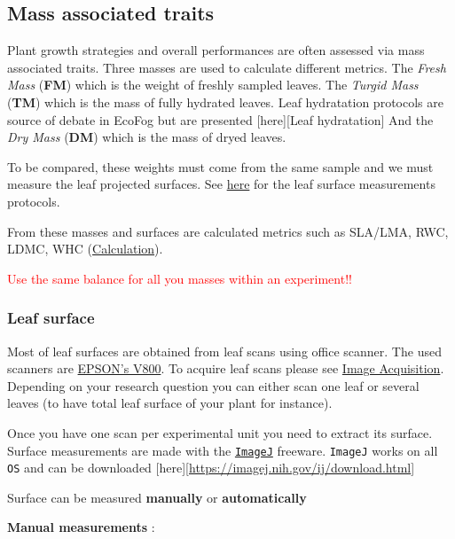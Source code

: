 \documentclass[
  12pt,
  american,
  a4paper,
  extrafontsizes,onecolumn,openright
  ]{memoir}
\newlength{\rf}
\begin{document}
\hypertarget{mass-associated-traits}{%
\subsection{Mass associated traits}\label{mass-associated-traits}}

Plant growth strategies and overall performances are often assessed via mass associated traits.
Three masses are used to calculate different metrics.
The \emph{Fresh Mass} (\textbf{FM}) which is the weight of freshly sampled leaves.
The \emph{Turgid Mass} (\textbf{TM}) which is the mass of fully hydrated leaves.
Leaf hydratation protocols are source of debate in EcoFog but are presented {[}here{]}{[}Leaf hydratation{]}
And the \emph{Dry Mass} (\textbf{DM}) which is the mass of dryed leaves.

To be compared, these weights must come from the same sample and we must measure the leaf projected surfaces.
See \protect\hyperlink{leaf-surface}{here} for the leaf surface measurements protocols.

From these masses and surfaces are calculated metrics such as SLA/LMA, RWC, LDMC, WHC (\protect\hyperlink{calculation}{Calculation}).

\textcolor{red}{Use the same balance for all you masses within an experiment!!}

\hypertarget{leaf-surface}{%
\subsubsection{Leaf surface}\label{leaf-surface}}

Most of leaf surfaces are obtained from leaf scans using office scanner.
The used scanners are \href{document/machine/EPSON_V800/usersguide.pdf}{EPSON's V800}.
To acquire leaf scans please see \protect\hyperlink{image-acquisition}{Image Acquisition}.
Depending on your research question you can either scan one leaf or several leaves (to have total leaf surface of your plant for instance).

Once you have one scan per experimental unit you need to extract its surface.
Surface measurements are made with the \href{document/software/ImageJ/user-guide-A4booklet.pdf}{\texttt{ImageJ}} freeware.
\texttt{ImageJ} works on all \texttt{OS} and can be downloaded {[}here{]}{[}\url{https://imagej.nih.gov/ij/download.html}{]}

Surface can be measured \textbf{manually} or \textbf{automatically}

\textbf{Manual measurements} :
\end{document}

